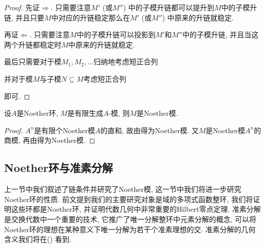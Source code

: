 \begin{proof}
  先证$\Rightarrow$. 只需要注意$M'$ (或$M''$) 中的子模升链都可以提升到$M$中的子模升链, 并且只要$M$中对应的升链稳定那么在$M'$ (或$M''$) 中原来的升链就稳定.

  再证$\Leftarrow$. 只需要注意$M$中的子模升链可以投影到$M'$和$M''$中的子模升链, 并且当这两个升链都稳定时$M$中原来的升链就稳定.

  最后只需要对于模$M_1, M_2, \dotsc$归纳地考虑短正合列
  并对于模$M$与子模$N\subseteq M$考虑短正合列
  即可.
\end{proof}

\begin{proposition}\label{prop:fgmoduleovernoetherring}
  设$A$是Noether环, $M$是有限生成$A$-模, 则$M$是Noether模.
\end{proposition}

\begin{proof}
  $A^n$是有限个Noether模$A$的直和, 故由得为Noether模. 又$M$是Noether模$A^n$的商模, 再由得为Noether模.
\end{proof}

\subsection{Noether环与准素分解}\label{subsec:algebra-primdecom}

上一节中我们叙述了链条件并研究了Noether模, 这一节中我们将进一步研究Noether环的性质. 前文提到我们的主要研究对象是域的多项式函数整环, 我们将证明这些环都是Noether环, 并证明代数几何中非常重要的Hilbert零点定理. 准素分解是交换代数中一个重要的技术, 它推广了唯一分解整环中元素分解的概念, 可以将Noether环的理想在某种意义下唯一分解为若干个准素理想的交. 准素分解的几何含义我们将在()%
看到.

